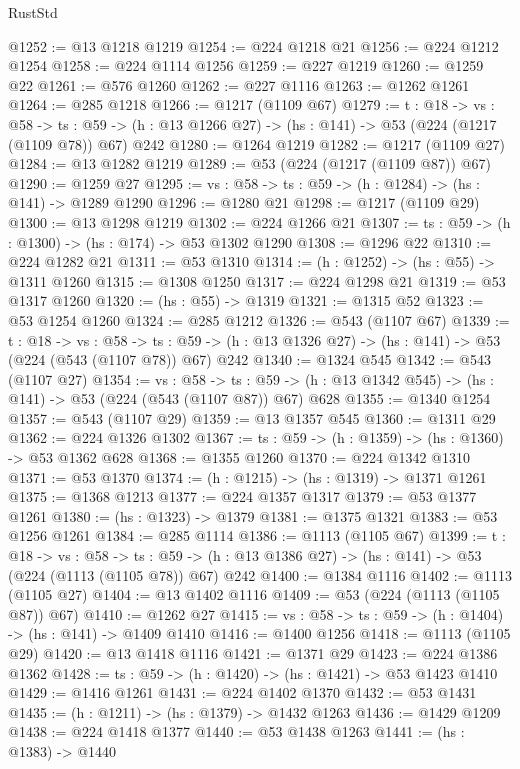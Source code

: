 \begin{lexlean}{RustStd}
\begin{coremodule}
@1252 := @13 @1218 @1219
@1254 := @224 @1218 @21
@1256 := @224 @1212 @1254
@1258 := @224 @1114 @1256
@1259 := @227 @1219
@1260 := @1259 @22
@1261 := @576 @1260
@1262 := @227 @1116
@1263 := @1262 @1261
@1264 := @285 @1218
@1266 := @1217 (@1109 @67)
@1279 := {t : @18} ->
  {vs : @58} ->
  {ts : @59} -> (h : @13 @1266 @27) -> (hs : @141) -> @53 (@224 (@1217 (@1109 @78)) @67) @242
@1280 := @1264 @1219
@1282 := @1217 (@1109 @27)
@1284 := @13 @1282 @1219
@1289 := @53 (@224 (@1217 (@1109 @87)) @67)
@1290 := @1259 @27
@1295 := {vs : @58} -> {ts : @59} -> (h : @1284) -> (hs : @141) -> @1289 @1290
@1296 := @1280 @21
@1298 := @1217 (@1109 @29)
@1300 := @13 @1298 @1219
@1302 := @224 @1266 @21
@1307 := {ts : @59} -> (h : @1300) -> (hs : @174) -> @53 @1302 @1290
@1308 := @1296 @22
@1310 := @224 @1282 @21
@1311 := @53 @1310
@1314 := (h : @1252) -> (hs : @55) -> @1311 @1260
@1315 := @1308 @1250
@1317 := @224 @1298 @21
@1319 := @53 @1317 @1260
@1320 := (hs : @55) -> @1319
@1321 := @1315 @52
@1323 := @53 @1254 @1260
@1324 := @285 @1212
@1326 := @543 (@1107 @67)
@1339 := {t : @18} ->
  {vs : @58} ->
  {ts : @59} -> (h : @13 @1326 @27) -> (hs : @141) -> @53 (@224 (@543 (@1107 @78)) @67) @242
@1340 := @1324 @545
@1342 := @543 (@1107 @27)
@1354 := {vs : @58} ->
  {ts : @59} -> (h : @13 @1342 @545) -> (hs : @141) -> @53 (@224 (@543 (@1107 @87)) @67) @628
@1355 := @1340 @1254
@1357 := @543 (@1107 @29)
@1359 := @13 @1357 @545
@1360 := @1311 @29
@1362 := @224 @1326 @1302
@1367 := {ts : @59} -> (h : @1359) -> (hs : @1360) -> @53 @1362 @628
@1368 := @1355 @1260
@1370 := @224 @1342 @1310
@1371 := @53 @1370
@1374 := (h : @1215) -> (hs : @1319) -> @1371 @1261
@1375 := @1368 @1213
@1377 := @224 @1357 @1317
@1379 := @53 @1377 @1261
@1380 := (hs : @1323) -> @1379
@1381 := @1375 @1321
@1383 := @53 @1256 @1261
@1384 := @285 @1114
@1386 := @1113 (@1105 @67)
@1399 := {t : @18} ->
  {vs : @58} ->
  {ts : @59} -> (h : @13 @1386 @27) -> (hs : @141) -> @53 (@224 (@1113 (@1105 @78)) @67) @242
@1400 := @1384 @1116
@1402 := @1113 (@1105 @27)
@1404 := @13 @1402 @1116
@1409 := @53 (@224 (@1113 (@1105 @87)) @67)
@1410 := @1262 @27
@1415 := {vs : @58} -> {ts : @59} -> (h : @1404) -> (hs : @141) -> @1409 @1410
@1416 := @1400 @1256
@1418 := @1113 (@1105 @29)
@1420 := @13 @1418 @1116
@1421 := @1371 @29
@1423 := @224 @1386 @1362
@1428 := {ts : @59} -> (h : @1420) -> (hs : @1421) -> @53 @1423 @1410
@1429 := @1416 @1261
@1431 := @224 @1402 @1370
@1432 := @53 @1431
@1435 := (h : @1211) -> (hs : @1379) -> @1432 @1263
@1436 := @1429 @1209
@1438 := @224 @1418 @1377
@1440 := @53 @1438 @1263
@1441 := (hs : @1383) -> @1440

\end{coremodule}
\end{lexlean}
